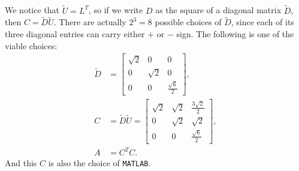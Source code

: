 \documentclass[11pt]{article}
\begin{document}
\subsection{}
We notice that $\tilde U = L^T$, so if we write $D$ as the square of a diagonal matrix $\tilde D$, then $C = \tilde D \tilde U$. There are actually $2^3=8$ possible choices of $\tilde D$, since each of its three diagonal entries can carry either $+$ or $-$ sign. The following is one of the viable choices:
\begin{equation}\begin{split}
\tilde D &= \begin{bmatrix} \sqrt{2} & 0 & 0 \\ 0 & \sqrt{2} & 0 \\ 0 & 0 & \frac{\sqrt{6}}2 \end{bmatrix},\\
C &= \tilde D \tilde U = \begin{bmatrix}\sqrt{2} & \sqrt{2} & \frac{3\sqrt{2}}2 \\ 0 & \sqrt{2} & \sqrt{2} \\ 0 & 0 & \frac{\sqrt{6}}2  \end{bmatrix},\\
A &= C^TC.
\end{split}\nonumber\end{equation} 
And this $C$ is also the choice of \texttt{MATLAB}.
\section{}
\end{document}

